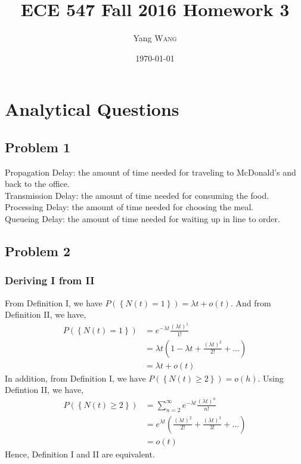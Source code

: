 \documentclass{article}
\title{ECE 547 Fall 2016 Homework 3} %
\author{Yang \textsc{Wang}}  %
\date{\today} %
\begin{document}
\maketitle %


\section*{Analytical Questions}
	\subsection*{Problem 1}

		Propagation Delay: the amount of time needed for traveling to McDonald's and
		back to the office. \\
		Transmission Delay: the amount of time needed for consuming the food. \\
		Processing Delay: the amount of time needed for choosing the meal. \\
		Queueing Delay: the amount of time needed for waiting up in line to order.

	\subsection*{Problem 2}
		\subsubsection*{Deriving I from II}
			From Definition I, we have $P(\left\{ N(t) = 1 \right\}) = \lambda t + o(t)$.
			And from Definition II, we have,
			\begin{align*}
				P(\left\{ N(t) = 1 \right\}) &= e^{-\lambda t} \frac{(\lambda t)^1}{1!} \\
				&= \lambda t (1 - \lambda t + \frac{(\lambda t)^2}{2!} + \ldots ) \\
				&= \lambda t + o(t)
			\end{align*}
			In addition, from Definition I, we have $P(\left\{ N(t) \geqslant 2 \right\}) = o(h)$.
			Using Defintion II, we have,
			\begin{align*}
				P(\left\{ N(t) \geqslant 2 \right\}) &= \sum_{n=2}^{\infty} e^{-\lambda t} \frac{(\lambda t)^n}{n!} \\
				&= e^{\lambda t} (\frac{(\lambda t)^2}{2!} + \frac{(\lambda t)^3}{3!} + \ldots) \\
				&= o(t)
			\end{align*}
			Hence, Definition I  and II are equivalent.
\end{document}
